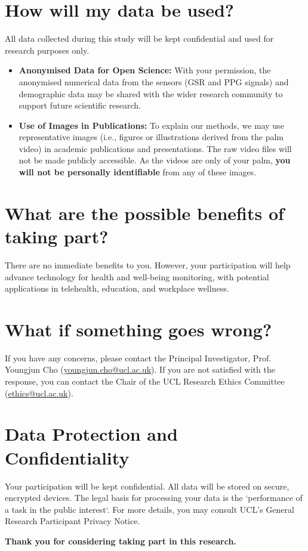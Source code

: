 \documentclass[12pt]{article}
\begin{document}
\bigskip
\bigskip

\section{How will my data be used?}
All data collected during this study will be kept confidential and used for research purposes only. 
\begin{itemize}
    \item \textbf{Anonymised Data for Open Science:} With your permission, the anonymised numerical data from the sensors (GSR and PPG signals) and demographic data may be shared with the wider research community to support future scientific research.
    \item \textbf{Use of Images in Publications:} To explain our methods, we may use representative images (i.e., figures or illustrations derived from the palm video) in academic publications and presentations. The raw video files will not be made publicly accessible. As the videos are only of your palm, \textbf{you will not be personally identifiable} from any of these images.
\end{itemize}

\section{What are the possible benefits of taking part?}
There are no immediate benefits to you. However, your participation will help advance technology for health and well-being monitoring, with potential applications in telehealth, education, and workplace wellness.

\section{What if something goes wrong?}
If you have any concerns, please contact the Principal Investigator, Prof. Youngjun Cho (\href{mailto:youngjun.cho@ucl.ac.uk}{youngjun.cho@ucl.ac.uk}). If you are not satisfied with the response, you can contact the Chair of the UCL Research Ethics Committee (\href{mailto:ethics@ucl.ac.uk}{ethics@ucl.ac.uk}).

\section{Data Protection and Confidentiality}
Your participation will be kept confidential. All data will be stored on secure, encrypted devices. The legal basis for processing your data is the `performance of a task in the public interest`. For more details, you may consult UCL's General Research Participant Privacy Notice.

\vspace{50pt}
\noindent\textbf{Thank you for considering taking part in this research.}
\end{document}
